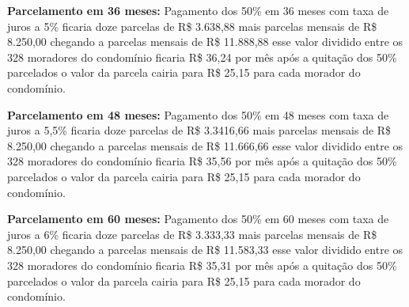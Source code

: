 \textbf{Parcelamento em 36 meses:}
Pagamento dos 50\% em 36 meses com taxa de juros a 5\% ficaria doze parcelas de R\$ 3.638,88 mais parcelas mensais de R\$ 8.250,00 chegando a parcelas mensais de R\$ 11.888,88 esse valor dividido entre os 328 moradores do condomínio ficaria R\$ 36,24 por mês após a quitação dos 50\% parcelados o valor da parcela cairia para R\$ 25,15 para cada morador do condomínio.

\textbf{Parcelamento em 48 meses:}
Pagamento dos 50\% em 48 meses com taxa de juros a 5,5\% ficaria doze parcelas de R\$ 3.3416,66 mais parcelas mensais de R\$ 8.250,00 chegando a parcelas mensais de R\$ 11.666,66 esse valor dividido entre os 328 moradores do condomínio ficaria R\$ 35,56 por mês após a quitação dos 50\% parcelados o valor da parcela cairia para R\$ 25,15 para cada morador do condomínio.

\textbf{Parcelamento em 60 meses:}
Pagamento dos 50\% em 60 meses com taxa de juros a 6\% ficaria doze parcelas de R\$ 3.333,33 mais parcelas mensais de R\$ 8.250,00 chegando a parcelas mensais de R\$ 11.583,33 esse valor dividido entre os 328 moradores do condomínio ficaria R\$ 35,31 por mês após a quitação dos 50\% parcelados o valor da parcela cairia para R\$ 25,15 para cada morador do condomínio.

